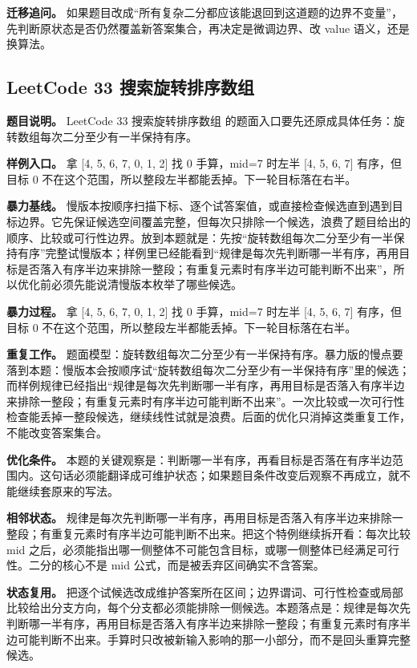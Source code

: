 \textbf{迁移追问。} 如果题目改成“所有复杂二分都应该能退回到这道题的边界不变量”，先判断原状态是否仍然覆盖新答案集合，再决定是微调边界、改 value 语义，还是换算法。

\subsection{LeetCode 33 搜索旋转排序数组}

\textbf{题目说明。} LeetCode 33 搜索旋转排序数组 的题面入口要先还原成具体任务：旋转数组每次二分至少有一半保持有序。

\textbf{样例入口。} 拿 [4, 5, 6, 7, 0, 1, 2] 找 0 手算，mid=7 时左半 [4, 5, 6, 7] 有序，但目标 0 不在这个范围，所以整段左半都能丢掉。下一轮目标落在右半。

\textbf{暴力基线。} 慢版本按顺序扫描下标、逐个试答案值，或直接检查候选直到遇到目标边界。它先保证候选空间覆盖完整，但每次只排除一个候选，浪费了题目给出的顺序、比较或可行性边界。放到本题就是：先按“旋转数组每次二分至少有一半保持有序”完整试慢版本；样例里已经能看到“规律是每次先判断哪一半有序，再用目标是否落入有序半边来排除一整段；有重复元素时有序半边可能判断不出来”，所以优化前必须先能说清慢版本枚举了哪些候选。

\textbf{暴力过程。} 拿 [4, 5, 6, 7, 0, 1, 2] 找 0 手算，mid=7 时左半 [4, 5, 6, 7] 有序，但目标 0 不在这个范围，所以整段左半都能丢掉。下一轮目标落在右半。

\textbf{重复工作。} 题面模型：旋转数组每次二分至少有一半保持有序。暴力版的慢点要落到本题：慢版本会按顺序试“旋转数组每次二分至少有一半保持有序”里的候选；而样例规律已经指出“规律是每次先判断哪一半有序，再用目标是否落入有序半边来排除一整段；有重复元素时有序半边可能判断不出来”。一次比较或一次可行性检查能丢掉一整段候选，继续线性试就是浪费。后面的优化只消掉这类重复工作，不能改变答案集合。

\textbf{优化条件。} 本题的关键观察是：判断哪一半有序，再看目标是否落在有序半边范围内。这句话必须能翻译成可维护状态；如果题目条件改变后观察不再成立，就不能继续套原来的写法。

\textbf{相邻状态。} 规律是每次先判断哪一半有序，再用目标是否落入有序半边来排除一整段；有重复元素时有序半边可能判断不出来。把这个特例继续拆开看：每次比较 mid 之后，必须能指出哪一侧整体不可能包含目标，或哪一侧整体已经满足可行性。二分的核心不是 mid 公式，而是被丢弃区间确实不含答案。

\textbf{状态复用。} 把逐个试候选改成维护答案所在区间；边界谓词、可行性检查或局部比较给出分支方向，每个分支都必须能排除一侧候选。本题落点是：规律是每次先判断哪一半有序，再用目标是否落入有序半边来排除一整段；有重复元素时有序半边可能判断不出来。手算时只改被新输入影响的那一小部分，而不是回头重算完整候选。

